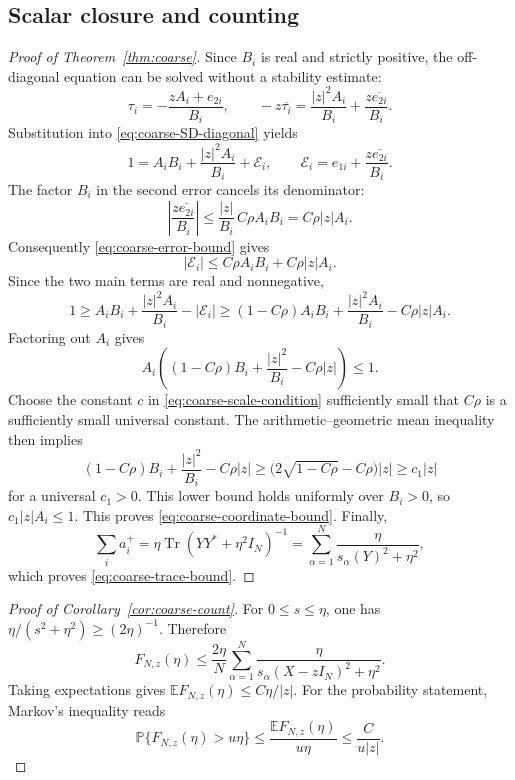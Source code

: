 \documentclass[11pt,reqno]{amsart}
\numberwithin{equation}{section}
\theoremstyle{plain}
\theoremstyle{definition}
\theoremstyle{remark}
\begin{document}
\subsection{Scalar closure and counting}

\begin{proof}[Proof of Theorem~\ref{thm:coarse}]
Since $B_i$ is real and strictly positive, the off-diagonal equation
can be solved without a stability estimate:
\[
 \tau_i=-\frac{zA_i+e_{2i}}{B_i},\qquad
 -z\overline{\tau_i}
 =\frac{|z|^2A_i}{B_i}+\frac{z\overline{e_{2i}}}{B_i}.
\]
Substitution into
\eqref{eq:coarse-SD-diagonal} yields
\begin{equation}\label{eq:coarse-scalar-equation}
 1=A_iB_i+\frac{|z|^2A_i}{B_i}+\mathcal E_i,
 \qquad
 \mathcal E_i=e_{1i}+\frac{z\overline{e_{2i}}}{B_i}.
\end{equation}
The factor $B_i$ in the second error cancels its denominator:
\[
 \left|\frac{z\overline{e_{2i}}}{B_i}\right|
 \le \frac{|z|}{B_i}\,C\rho A_iB_i=C\rho|z|A_i.
\]
Consequently \eqref{eq:coarse-error-bound} gives
\begin{equation}\label{eq:coarse-scalar-error}
 |\mathcal E_i|\le C\rho A_iB_i+C\rho|z|A_i.
\end{equation}
Since the two main terms are real and nonnegative,
\[
 1\ge A_iB_i+\frac{|z|^2A_i}{B_i}-|\mathcal E_i|
 \ge (1-C\rho)A_iB_i+\frac{|z|^2A_i}{B_i}-C\rho|z|A_i.
\]
Factoring out $A_i$ gives
\[
 A_i\left((1-C\rho)B_i+\frac{|z|^2}{B_i}-C\rho|z|\right)\le1.
\]
Choose the constant $c$ in \eqref{eq:coarse-scale-condition} sufficiently
small that $C\rho$ is a sufficiently small universal constant.  The
arithmetic--geometric mean inequality then implies
\[
 (1-C\rho)B_i+\frac{|z|^2}{B_i}-C\rho|z|
 \ge\bigl(2\sqrt{1-C\rho}-C\rho\bigr)|z|
 \ge c_1|z|
\]
for a universal $c_1>0$. This lower bound holds uniformly over
$B_i>0$, so $c_1|z|A_i\le1$. This proves
\eqref{eq:coarse-coordinate-bound}.  Finally,
\[
 \sum_i a_i^+=\eta\operatorname{Tr}(YY^*+\eta^2I_N)^{-1}
 =\sum_{\alpha=1}^N\frac{\eta}{s_\alpha(Y)^2+\eta^2},
\]
which proves \eqref{eq:coarse-trace-bound}.
\end{proof}

\begin{proof}[Proof of Corollary~\ref{cor:coarse-count}]
For $0\le s\le\eta$, one has
$\eta/(s^2+\eta^2)\ge(2\eta)^{-1}$.  Therefore
\[
 F_{N,z}(\eta)\le\frac{2\eta}{N}
 \sum_{\alpha=1}^N\frac{\eta}{s_\alpha(X-zI_N)^2+\eta^2}.
\]
Taking expectations gives $\mathbb EF_{N,z}(\eta)\le C\eta/|z|$.
For the probability statement, Markov's inequality reads
\[
 \mathbb P\{F_{N,z}(\eta)>u\eta\}
 \le\frac{\mathbb EF_{N,z}(\eta)}{u\eta}
 \le\frac{C}{u|z|}.
\]
\end{proof}
\end{document}
